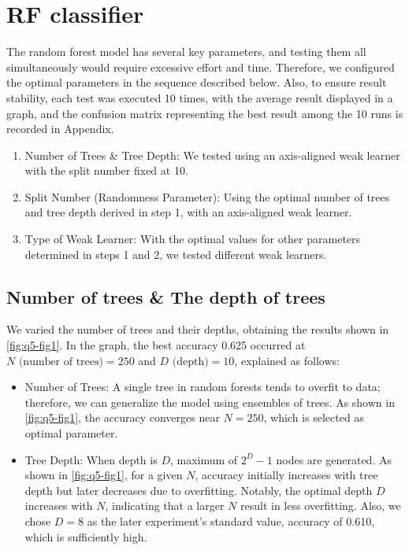 \section{RF classifier}
\label{sec:intro}

The random forest model has several key parameters, and testing them all simultaneously would require excessive effort and time. Therefore, we configured the optimal parameters in the sequence described below. Also, to ensure result stability, each test was executed 10 times, with the average result displayed in a graph, and the confusion matrix representing the best result among the 10 runs is recorded in Appendix.
\begin{enumerate}
	\item Number of Trees \& Tree Depth: We tested using an axis-aligned weak learner with the split number fixed at 10.
	\item Split Number (Randomness Parameter): Using the optimal number of trees and tree depth derived in step 1, with an axis-aligned weak learner.
	\item Type of Weak Learner: With the optimal values for other parameters determined in steps 1 and 2, we tested different weak learners.
\end{enumerate}

\subsection{Number of trees \& The depth of trees}
We varied the number of trees and their depths, obtaining the results shown in \cref{fig:q5-fig1}. In the graph, the best accuracy 0.625 occurred at $N \text{ (number of trees)} = 250$ and $D\text{ (depth)}=10$, explained as follows:
\begin{itemize}
	\item Number of Trees: A single tree in random forests tends to overfit to data; therefore, we can generalize the model using ensembles of trees. As shown in \cref{fig:q5-fig1}, the accuracy converges near $N=250$, which is selected as optimal parameter.
	\item Tree Depth: When depth is $D$, maximum of $2^D-1$ nodes are generated. As shown in \cref{fig:q5-fig1}, for a given $N$, accuracy initially increases with tree depth but later decreases due to overfitting. Notably, the optimal depth $D$ increases with $N$, indicating that a larger $N$ result in less overfitting. Also, we chose $D=8$ as the later experiment's standard value, accuracy of 0.610, which is sufficiently high.
\end{itemize}

